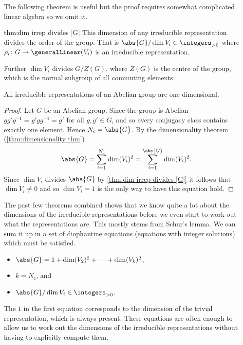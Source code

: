 \documentclass[fleqn]{NotesClass}
\newcommand*{\positiveintegers}{\integers_{>0}}
\begin{document}
    The following theorem is useful but the proof requires somewhat complicated linear algebra so we omit it.
    \begin{thm}{}{thm:dim irrep divides |G|}
        This dimension of any irreducible representation divides the order of the group.
        That is \(\abs{G} / \dim V_i \in \positiveintegers\) where \(\rho_i \colon G \to \generalLinear(V_i)\) is an irreducible representation.
        
        Further \(\dim V_i\) divides \(G / Z(G)\), where \(Z(G)\) is the centre of the group, which is the normal subgroup of all commuting elements.
    \end{thm}
    
    \begin{crl}{}{}
        All irreducible representations of an Abelian group are one dimensional.
        
        \begin{proof}
            Let \(G\) be an Abelian group.
            Since the group is Abelian \(gg'g^{-1} = g'gg^{-1} = g'\) for all \(g, g' \in G\), and so every conjugacy class contains exactly one element.
            Hence \(N_{\mathrm{c}} = \abs{G}\).
            By the dimensionality theorem (\cref{thm:dimensionality thm})
            \begin{equation}
                \abs{G} = \sum_{i = 1}^{N_{\mathrm{c}}} \dim(V_i)^2 = \sum_{i = 1}^{\abs{G}} \dim(V_i)^2.
            \end{equation}
            Since \(\dim V_i\) divides \(\abs{G}\) by \cref{thm:dim irrep divides |G|} it follows that \(\dim V_i \ne 0\) and so \(\dim V_i = 1\) is the only way to have this equation hold.
        \end{proof}
    \end{crl}
    
    The past few theorems combined shows that we know quite a lot about the dimensions of the irreducible representations before we even start to work out what the representations are.
    This mostly stems from Schur's lemma.
    We can sum it up in a set of diophantine equations (equations with integer solutions) which must be satisfied.
    \begin{important}
        \begin{itemize}
            \item \(\abs{G} = 1 + \dim(V_2)^2 + \dotsb + \dim(V_k)^2\),
            \item \(k = N_{\mathrm{c}}\), and
            \item \(\abs{G} / \dim V_i \in \positiveintegers\).
        \end{itemize}
    \end{important}
    The \(1\) in the first equation corresponds to the dimension of the trivial representation, which is always present.
    These equations are often enough to allow us to work out the dimensions of the irreducible representations without having to explicitly compute them.
    
    
    
    
    \appendixpage
    \begin{appendices}
        
        
    \end{appendices}
    
    \backmatter
    \renewcommand{\glossaryname}{Acronyms}
    \printglossary[acronym]
    \printindex
\end{document}
